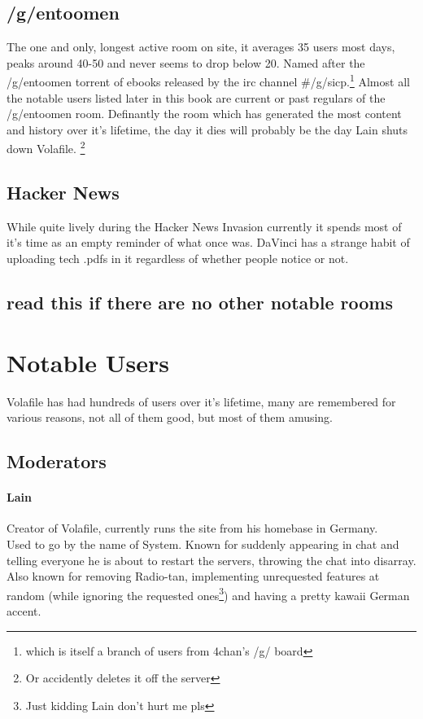 \documentclass[12pt]{report}
\begin{document}
{\section{/g/entoomen}
	The one and only, longest active room on site, it averages 35 users most days, peaks around 40-50 and never seems to drop below 20. Named after the /g/entoomen torrent of ebooks released by the irc channel {\#}/g/sicp.\footnote{which is itself a branch of users from 4chan's /g/ board}
	 Almost all the notable users listed later in this book are current or past regulars of the /g/entoomen room. Definantly the room which has generated the most content and history over it's lifetime, the day it dies will probably be the day Lain shuts down Volafile. \footnote{Or accidently deletes it off the server}

\section{Hacker News}
	While quite lively during the Hacker News Invasion currently it spends most of it's time as an empty reminder of what once was. DaVinci has a strange habit of uploading tech .pdfs in it regardless of whether people notice or not.
	
\section{read this if there are no other notable rooms}


\chapter{Notable Users}
	Volafile has had hundreds of users over it's lifetime, many are remembered for various reasons, not all of them good, but most of them amusing.

\section{Moderators}


\subsubsection{Lain}
	Creator of Volafile, currently runs the site from his homebase in Germany. \\
	Used to go by the name of System. Known for suddenly appearing in chat and telling everyone he is about to restart the servers, throwing  the chat into disarray. Also known for removing Radio-tan, implementing unrequested features at random (while ignoring the requested ones\footnote{Just kidding Lain don't hurt me pls}) and having a pretty kawaii German accent.
	
}
\end{document}
